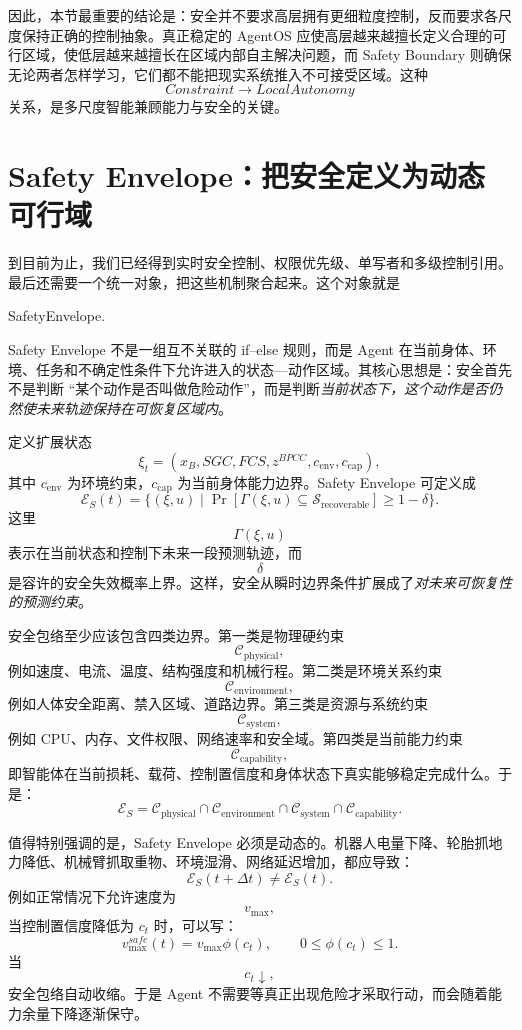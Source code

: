 因此，本节最重要的结论是：安全并不要求高层拥有更细粒度控制，反而要求各尺度保持正确的控制抽象。真正稳定的 AgentOS 应使高层越来越擅长定义合理的可行区域，使低层越来越擅长在区域内部自主解决问题，而 Safety Boundary 则确保无论两者怎样学习，它们都不能把现实系统推入不可接受区域。这种
\[
Constraint\rightarrow LocalAutonomy
\]
关系，是多尺度智能兼顾能力与安全的关键。

\section{Safety Envelope：把安全定义为动态可行域}

到目前为止，我们已经得到实时安全控制、权限优先级、单写者和多级控制引用。最后还需要一个统一对象，把这些机制聚合起来。这个对象就是
\begin{statementbox}
SafetyEnvelope.
\end{statementbox}
Safety Envelope 不是一组互不关联的 if--else 规则，而是 Agent 在当前身体、环境、任务和不确定性条件下允许进入的状态—动作区域。其核心思想是：安全首先不是判断 ``某个动作是否叫做危险动作''，而是判断\emph{当前状态下，这个动作是否仍然使未来轨迹保持在可恢复区域内}。

定义扩展状态
\[
\xi_t
=
(
x_B,
SGC,
FCS,
z^{BPCC},
c_{\mathrm{env}},
c_{\mathrm{cap}}
),
\]
其中 $c_{\mathrm{env}}$ 为环境约束，$c_{\mathrm{cap}}$ 为当前身体能力边界。Safety Envelope 可定义成
\[
\boxed{
\mathcal E_S(t)
=
\{
(\xi,u)
\mid
\Pr[
\Gamma(\xi,u)
\subseteq
\mathcal S_{\mathrm{recoverable}}
]
\geq
1-\delta
\}.
}
\]
这里
\[
\Gamma(\xi,u)
\]
表示在当前状态和控制下未来一段预测轨迹，而
\[
\delta
\]
是容许的安全失效概率上界。这样，安全从瞬时边界条件扩展成了\emph{对未来可恢复性的预测约束}。

安全包络至少应该包含四类边界。第一类是物理硬约束
\[
\mathcal C_{\mathrm{physical}},
\]
例如速度、电流、温度、结构强度和机械行程。第二类是环境关系约束
\[
\mathcal C_{\mathrm{environment}},
\]
例如人体安全距离、禁入区域、道路边界。第三类是资源与系统约束
\[
\mathcal C_{\mathrm{system}},
\]
例如 CPU、内存、文件权限、网络速率和安全域。第四类是当前能力约束
\[
\mathcal C_{\mathrm{capability}},
\]
即智能体在当前损耗、载荷、控制置信度和身体状态下真实能够稳定完成什么。于是：
\[
\mathcal E_S
=
\mathcal C_{\mathrm{physical}}
\cap
\mathcal C_{\mathrm{environment}}
\cap
\mathcal C_{\mathrm{system}}
\cap
\mathcal C_{\mathrm{capability}}.
\]

值得特别强调的是，Safety Envelope 必须是动态的。机器人电量下降、轮胎抓地力降低、机械臂抓取重物、环境湿滑、网络延迟增加，都应导致：
\[
\mathcal E_S(t+\Delta t)
\neq
\mathcal E_S(t).
\]
例如正常情况下允许速度为
\[
v_{\max},
\]
当控制置信度降低为 $c_t$ 时，可以写：
\[
v_{\max}^{safe}(t)
=
v_{\max}
\phi(c_t),
\qquad
0\leq\phi(c_t)\leq1.
\]
当
\[
c_t\downarrow,
\]
安全包络自动收缩。于是 Agent 不需要等真正出现危险才采取行动，而会随着能力余量下降逐渐保守。

